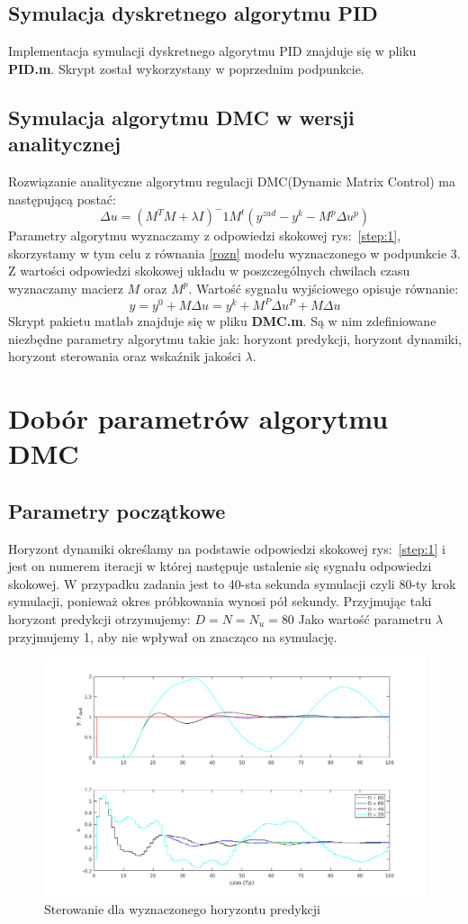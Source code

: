 \documentclass[a4paper, 11pt]{article}
\begin{document}
\subsection{Symulacja dyskretnego algorytmu PID}
Implementacja symulacji dyskretnego algorytmu PID znajduje się w pliku \textbf{PID.m}. Skrypt został wykorzystany w poprzednim podpunkcie. 
\subsection{Symulacja algorytmu DMC w wersji analitycznej}
 Rozwiązanie analityczne algorytmu regulacji DMC(Dynamic Matrix Control) ma następującą postać: 
 $$\Delta u = (M^TM+\lambda I)^-1M^t(y^{zad}-y^k-M^p\Delta u^p) $$
Parametry algorytmu wyznaczamy z odpowiedzi skokowej rys:~\ref{step:1}, skorzystamy w tym celu z równania \ref{rozn} modelu wyznaczonego w podpunkcie 3. Z wartości odpowiedzi skokowej układu w poszczególnych chwilach czasu wyznaczamy macierz $M$ oraz $M^p$. Wartość sygnału wyjściowego opisuje równanie: 
$$y = y^0 + M\Delta u = y^k +M^P \Delta u^P + M\Delta u$$
Skrypt pakietu matlab znajduje się w pliku \textbf{DMC.m}. Są w nim zdefiniowane niezbędne parametry algorytmu takie jak: horyzont predykcji, horyzont dynamiki, horyzont sterowania oraz wskaźnik jakości $\lambda$. 
\section{Dobór parametrów algorytmu DMC}

\subsection{Parametry początkowe}
Horyzont dynamiki określamy na podstawie odpowiedzi skokowej rys:~\ref{step:1} i jest on numerem iteracji w której następuje ustalenie się sygnału odpowiedzi skokowej. W przypadku zadania jest to 40-sta sekunda symulacji czyli 80-ty krok symulacji, ponieważ okres próbkowania wynosi pół sekundy. Przyjmując taki horyzont predykcji otrzymujemy: 
$D = N = N_u = 80$
Jako wartość parametru $\lambda$ przyjmujemy 1, aby nie wpływał on znacząco na symulację. 
\begin{figure}[H]
\centering
\includegraphics[scale=0.60]{horyzont_predykcji_dmc.png}
\caption{Sterowanie dla wyznaczonego horyzontu predykcji}
\end{figure}
\end{document}
